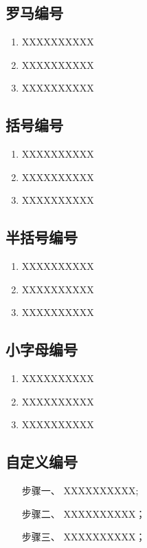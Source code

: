 \subsection{罗马编号}
\begin{enumerate}[label=(\roman*)]
 \item XXXXXXXXXX
 \item XXXXXXXXXX
 \item XXXXXXXXXX
\end{enumerate}

\subsection{括号编号}
\begin{enumerate}[label=(\arabic*)]
 \item XXXXXXXXXX
 \item XXXXXXXXXX
 \item XXXXXXXXXX
\end{enumerate}

\subsection{半括号编号}
\begin{enumerate}[label=\arabic*)]
 \item XXXXXXXXXX
 \item XXXXXXXXXX
 \item XXXXXXXXXX
\end{enumerate}

\subsection{小字母编号}
\begin{enumerate}[label=\alph*)]
 \item XXXXXXXXXX
 \item XXXXXXXXXX
 \item XXXXXXXXXX
\end{enumerate}

\subsection{自定义编号}
\begin{enumerate}[leftmargin = 6em, labelsep = 0em]
    \item[步骤一、] XXXXXXXXXX;
    \item[步骤二、] XXXXXXXXXX；
    \item[步骤三、] XXXXXXXXXX；
\end{enumerate}

